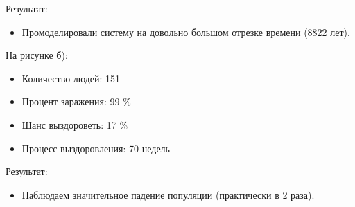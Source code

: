 \documentclass[14pt,a4paper,report]{report}
\begin{document}
Результат:
\begin{itemize}
\item Промоделировали систему на довольно большом отрезке времени (8822 лет). 
\end{itemize}


На рисунке б):
\begin{itemize}
\item Количество людей: 151
\item Процент заражения: 99 \%
\item Шанс выздороветь: 17 \%
\item Процесс выздоровления: 70 недель
\end{itemize}
Результат:
\begin{itemize}
\item Наблюдаем значительное падение популяции (практически в 2 раза).
\end{itemize}
\clearpage

\begin{figure}[h]
\begin{minipage}[h]{0.49\linewidth}
\end{minipage}
\hfill
\begin{minipage}[h]{0.49\linewidth}
\end{minipage}
\label{ris:image1}
\end{figure}
\end{document}
